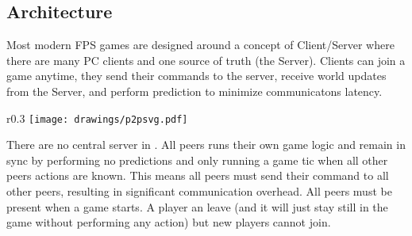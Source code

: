 \subsection{Architecture}
Most modern FPS games are designed around a concept of Client/Server where there are many PC clients and one source of truth (the Server). Clients can join a game anytime, they send their commands to the server, receive world updates from the Server, and perform prediction to minimize communicatons latency.\\
\par
\begin{wrapfigure}[8]{r}{0.3\textwidth}
\centering
\texttt{[image: drawings/p2psvg.pdf]}
\end{wrapfigure}
There are no central server in \doom. All peers runs their own game logic and remain in sync by performing no predictions and only running a game tic when all other peers actions are known. This means all peers must send their command to all other peers, resulting in significant communication overhead. 
All peers must be present when a game starts. A player an leave (and it will just stay still in the game without performing any action) but new players cannot join.
\pagebreak





